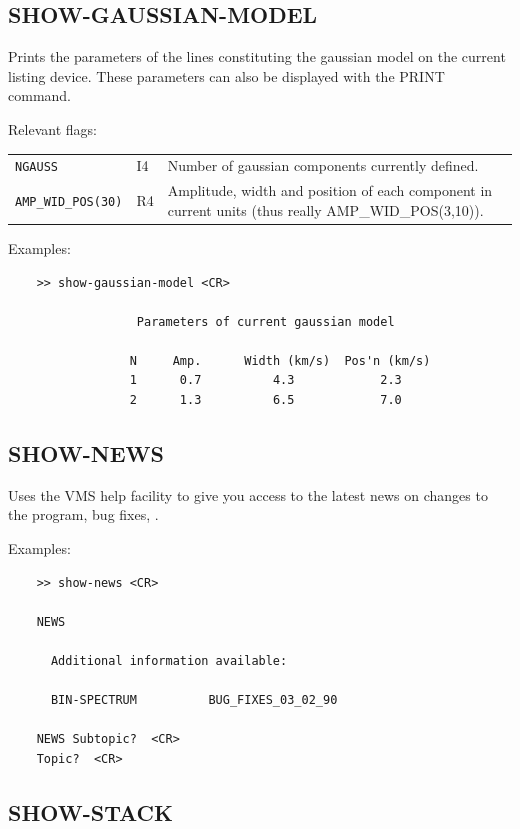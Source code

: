 \documentclass[11pt,twoside]{report}
\begin{document}
\subsection{SHOW-GAUSSIAN-MODEL} 

Prints the parameters of the lines constituting the gaussian model on the
current listing device. These parameters can also be displayed with the
PRINT command.

Relevant flags:\\
\begin{tabular}{lll}
  \verb+NGAUSS+   & I4 & Number of gaussian components currently defined.\\
  \verb+AMP_WID_POS(30)+ & R4 & \parbox[t]{4in}
                                 {Amplitude, width and position of each
                                  component in current units (thus
                                  really AMP\_WID\_POS(3,10)).}
\end{tabular}

Examples:
\begin{verbatim}
    >> show-gaussian-model <CR>

                  Parameters of current gaussian model

                 N     Amp.      Width (km/s)  Pos'n (km/s)
                 1      0.7          4.3            2.3
                 2      1.3          6.5            7.0
\end{verbatim}

\subsection{SHOW-NEWS} 

Uses the VMS help facility to give you access to the latest news on
changes to the program, bug fixes, \etc.

Examples:
\begin{verbatim}
    >> show-news <CR>

    NEWS

      Additional information available:

      BIN-SPECTRUM          BUG_FIXES_03_02_90

    NEWS Subtopic?  <CR>
    Topic?  <CR>
\end{verbatim}

\subsection{SHOW-STACK} 
\end{document}
